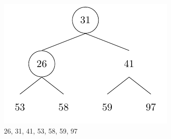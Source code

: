 \begin{center}
\begin{minipage}{0.32\textwidth}
  \begin{figure}[H]
    \centering
    \includegraphics[width=\textwidth]{Figure/HeapSort6.pdf}
    \caption*{26, 31, 41, 53, 58, 59, 97}
  \end{figure}
\end{minipage}
\end{center}

